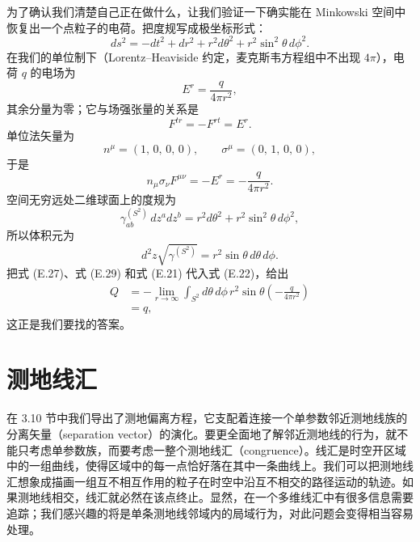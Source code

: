 为了确认我们清楚自己正在做什么，让我们验证一下确实能在 Minkowski 空间中恢复出一个点粒子的电荷。把度规写成极坐标形式：
\begin{equation*}
ds^2 = -dt^2 + dr^2 + r^2d\theta^2 + r^2\sin^2\theta\,d\phi^2.
\tag{E.23}
\end{equation*}
在我们的单位制下（Lorentz–Heaviside 约定，麦克斯韦方程组中不出现 $4\pi$），电荷 $q$ 的电场为
\begin{equation*}
E^r = \frac{q}{4\pi r^2},
\tag{E.24}
\end{equation*}
其余分量为零；它与场强张量的关系是
\begin{equation*}
F^{tr} = -F^{rt} = E^r.
\tag{E.25}
\end{equation*}
单位法矢量为
\begin{equation*}
n^\mu = (1,\,0,\,0,\,0),\qquad \sigma^\mu = (0,\,1,\,0,\,0),
\tag{E.26}
\end{equation*}
于是
\begin{equation*}
n_\mu\sigma_\nu F^{\mu\nu} = -E^r = -\frac{q}{4\pi r^2}.
\tag{E.27}
\end{equation*}
空间无穷远处二维球面上的度规为
\begin{equation*}
\gamma^{(S^2)}_{ab}\,dz^a dz^b = r^2d\theta^2 + r^2\sin^2\theta\,d\phi^2,
\tag{E.28}
\end{equation*}
所以体积元为
\begin{equation*}
d^2z\sqrt{\gamma^{(S^2)}} = r^2\sin\theta\,d\theta\,d\phi.
\tag{E.29}
\end{equation*}
把式 (E.27)、式 (E.29) 和式 (E.21) 代入式 (E.22)，给出
\begin{align*}
Q &= -\lim_{r\to\infty}\int_{S^2} d\theta\,d\phi\,r^2\sin\theta\left(-\frac{q}{4\pi r^2}\right) \\
&= q,
\tag{E.30}
\end{align*}
这正是我们要找的答案。


\chapter{测地线汇}

在 3.10 节中我们导出了测地偏离方程，它支配着连接一个单参数邻近测地线族的分离矢量（separation vector）的演化。要更全面地了解邻近测地线的行为，就不能只考虑单参数族，而要考虑一整个测地线汇（congruence）。线汇是时空开区域中的一组曲线，使得区域中的每一点恰好落在其中一条曲线上。我们可以把测地线汇想象成描画一组互不相互作用的粒子在时空中沿互不相交的路径运动的轨迹。如果测地线相交，线汇就必然在该点终止。显然，在一个多维线汇中有很多信息需要追踪；我们感兴趣的将是单条测地线邻域内的局域行为，对此问题会变得相当容易处理。


